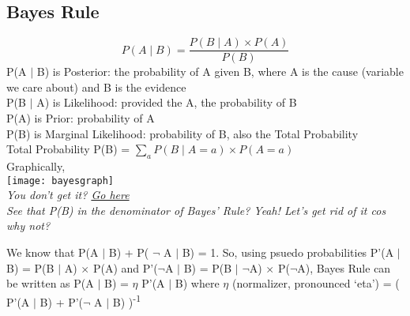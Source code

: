 \documentclass[12pt]{article}
\begin{document}
\subsection*{Bayes Rule}
\begin{equation}
P(A \mid B) = \frac{P(B \mid A) \times P(A)}{P(B)}
\end{equation}
\colorbox{myGray}{P(A $\mid$ B)} is Posterior: the probability of A given B, where A is the cause (variable we care about) and B is the evidence\\
\colorbox{myGray}{P(B $\mid$ A)} is Likelihood: provided the A, the probability of B\\
\colorbox{myGray}{P(A)} is Prior: probability of A\\
\colorbox{myGray}{P(B)} is Marginal Likelihood: probability of B, also the Total Probability\\
\vspace{2em}
Total Probability \colorbox{myGray}{P(B)} = $\sum_{a}^{}P(B \mid A = a) \times P(A = a)$\\
\vspace{2em}
Graphically,\\
\texttt{[image: bayesgraph]}\\
\vspace{4em}
\textit{You don't get it? \href{https://classroom.udacity.com/courses/cs271/lessons/48624746/concepts/487193570923}{Go here}}\\
\textit{See that P(B) in the denominator of Bayes' Rule? Yeah! Let's get rid of it cos why not?}
\par
We know that P(A $\mid$ B) + P( $\neg$ A $\mid$ B) = 1. So, using psuedo probabilities P'(A $\mid$ B) = P(B $\mid$ A) $\times$ P(A) and P'($\neg$A $\mid$ B) = P(B $\mid$ $\neg$A) $\times$ P($\neg$A), Bayes Rule can be written as P(A $\mid$ B) = $\eta$ P'(A $\mid$ B) where $\eta$ (normalizer, pronounced \enquote*{eta}) = ( P'(A $\mid$ B) + P'($\neg$ A $\mid$ B) )\textsuperscript{-1}
\end{document}
